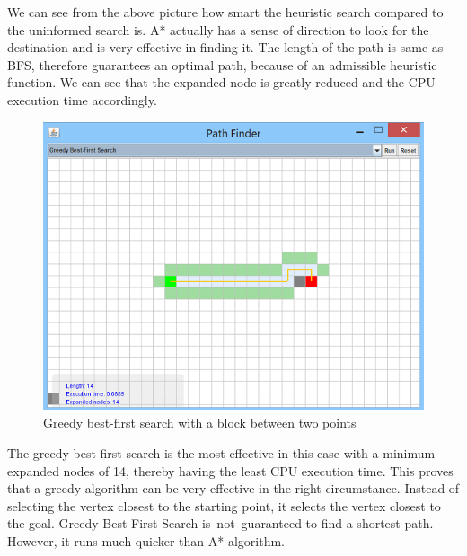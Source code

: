 \documentclass[a4paper]{article}
\begin{document}
\noindent We can see from the above picture how smart the heuristic search compared to the uninformed search is. A* actually has a sense of direction to look for the destination and is very effective in finding it. The length of the path is same as BFS, therefore guarantees an optimal path, because of an admissible heuristic function. We can see that the expanded node is greatly reduced and the CPU execution time accordingly. \\

\begin{figure}[h!]
  \centering
    \includegraphics[scale=.9]{images/greedy1.png}
  \caption{Greedy best-first search with a block between two points}
\end{figure}

\noindent The greedy best-first search is the most effective in this case with a minimum expanded nodes of 14, thereby having the least CPU execution time. This proves that a greedy algorithm can be very effective in the right circumstance. Instead of selecting the vertex closest to the starting point, it selects the vertex closest to the goal. Greedy Best-First-Search is not guaranteed to find a shortest path. However, it runs much quicker than A* algorithm. \\
\end{document}
